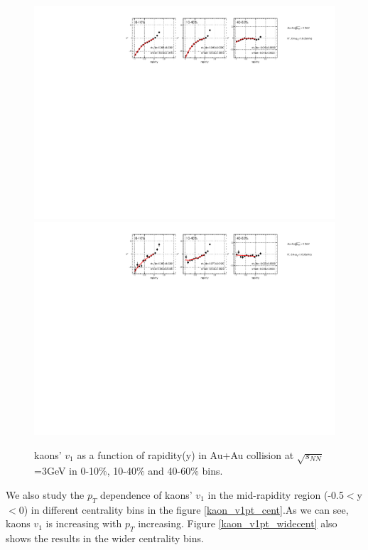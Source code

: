 \begin{figure}[h]
\includegraphics[scale=0.8]{chapter3/fig/v1ypikp/kaonp_v1y_wide_cent.pdf}
\includegraphics[scale=0.8]{chapter3/fig/v1ypikp/kaonm_v1y_wide_cent.pdf}
\caption{\label{kaon_v1y_widecent} kaons' $v_{1}$ as a function of rapidity(y) in Au+Au collision at $\sqrt{s_{NN}}$=3GeV in 0-10\%, 10-40\% and 40-60\% bins.}
\end{figure}

\clearpage

We also study the $p_{T}$ dependence of kaons' $v_{1}$ in the mid-rapidity region (-0.5$<$y$<$0) in different centrality bins in the figure \ref{kaon_v1pt_cent}.As we can see, kaons $v_{1}$ is increasing with $p_{T}$ increasing. Figure \ref{kaon_v1pt_widecent} also shows the results in the wider centrality bins. 

